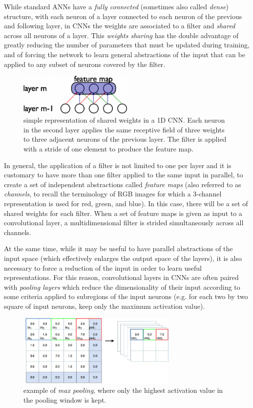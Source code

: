 While standard ANNs have a \textit{fully connected} (sometimes also called 
\textit{dense}) structure, with each neuron of a layer connected to each neuron 
of the previous and following layer, in CNNs the weights are associated to a 
filter and \textit{shared} across all neurons of a layer. 
This \textit{weights sharing} has the double advantage of greatly reducing the 
number of parameters that must be updated during training, and of forcing the 
network to learn general abstractions of the input that can be applied to any 
subset of neurons covered by the filter.
%
\begin{figure}[h]
\includegraphics[width=0.5\textwidth]{pictures/shared_weights}
\centering
\caption{simple representation of shared weights in a 1D CNN. Each neuron in 
	 the second layer applies the same receptive field of three weights
	 to three adjacent neurons of the previous layer. The filter is applied 
	 with a stride of one element to produce the feature map.}
\end{figure}
%

In general, the application of a filter is not limited to one per layer and it 
is customary to have more than one filter applied to the same input in parallel,
to create a set of independent abstractions called \textit{feature maps} (also
referred to as \textit{channels}, to recall the terminology of RGB images for 
which a 3-channel representation is used for red, green, and blue). In 
this case, there will be a set of shared weights for each filter.
When a set of feature maps is given as input to a convolutional layer, a 
multidimensional filter is strided simultaneously across all channels.

At the same time, while it may be useful to have parallel abstractions of the 
input space (which effectively enlarges the output space of the layers), it is
also necessary to force a reduction of the input in order to learn useful 
representations. 
For this reason, convolutional layers in CNNs are often paired with 
\textit{pooling layers} which reduce the dimensionality of their input according
to some criteria applied to subregions of the input neurons (e.g. for each two 
by two square of input neurons, keep only the maximum activation value).
%
\begin{figure}[h]
\includegraphics[width=0.7\textwidth]{pictures/max-pooling}
\centering
\caption{example of \textit{max pooling}, where only the highest activation 
	 value in the pooling window is kept.}
\end{figure}
%

